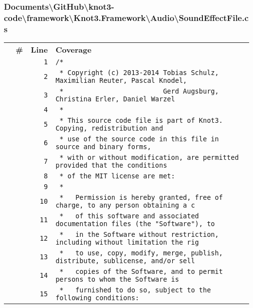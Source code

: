 \documentclass[a4paper,10pt]{article}
\begin{document}
\subsubsection{Documents\textbackslash GitHub\textbackslash knot3-code\textbackslash framework\textbackslash Knot3.Framework\textbackslash Audio\textbackslash SoundEffectFile.cs}
\begin{longtable}[l]{lrrl}
\textbf{} & \textbf{\#} & \textbf{Line} & \textbf{Coverage}\\
\cellcolor{gray} &  & \verb~1~ & \verb~/*~\\
\cellcolor{gray} &  & \verb~2~ & \verb~ * Copyright (c) 2013-2014 Tobias Schulz, Maximilian Reuter, Pascal Knodel,~\\
\cellcolor{gray} &  & \verb~3~ & \verb~ *                         Gerd Augsburg, Christina Erler, Daniel Warzel~\\
\cellcolor{gray} &  & \verb~4~ & \verb~ *~\\
\cellcolor{gray} &  & \verb~5~ & \verb~ * This source code file is part of Knot3. Copying, redistribution and~\\
\cellcolor{gray} &  & \verb~6~ & \verb~ * use of the source code in this file in source and binary forms,~\\
\cellcolor{gray} &  & \verb~7~ & \verb~ * with or without modification, are permitted provided that the conditions~\\
\cellcolor{gray} &  & \verb~8~ & \verb~ * of the MIT license are met:~\\
\cellcolor{gray} &  & \verb~9~ & \verb~ *~\\
\cellcolor{gray} &  & \verb~10~ & \verb~ *   Permission is hereby granted, free of charge, to any person obtaining a c~\\
\cellcolor{gray} &  & \verb~11~ & \verb~ *   of this software and associated documentation files (the "Software"), to ~\\
\cellcolor{gray} &  & \verb~12~ & \verb~ *   in the Software without restriction, including without limitation the rig~\\
\cellcolor{gray} &  & \verb~13~ & \verb~ *   to use, copy, modify, merge, publish, distribute, sublicense, and/or sell~\\
\cellcolor{gray} &  & \verb~14~ & \verb~ *   copies of the Software, and to permit persons to whom the Software is~\\
\cellcolor{gray} &  & \verb~15~ & \verb~ *   furnished to do so, subject to the following conditions:~\\

\end{longtable}
\end{document}
